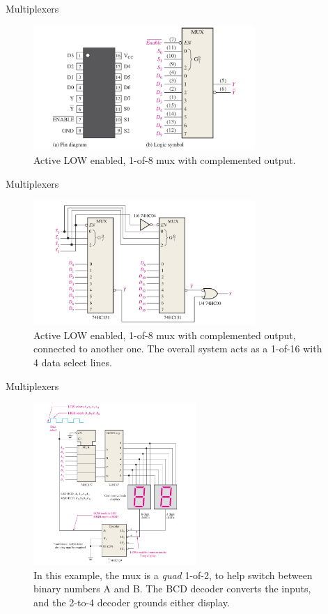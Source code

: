 \documentclass{beamer}
\begin{document}
\begin{frame}{Multiplexers}
\begin{figure}
\centering
\includegraphics[width=0.75\textwidth,trim=3cm 0cm 3cm 0cm,clip=true]{figures/mux5.pdf}
\caption{\label{fig:mux5} Active LOW enabled, 1-of-8 mux with complemented output.}
\end{figure}
\end{frame}

\begin{frame}{Multiplexers}
\begin{figure}
\centering
\includegraphics[width=0.75\textwidth,trim=2cm 0cm 3cm 0cm,clip=true]{figures/mux6.pdf}
\caption{\label{fig:mux6} Active LOW enabled, 1-of-8 mux with complemented output, connected to another one.  The overall system acts as a 1-of-16 with 4 data select lines.}
\end{figure}
\end{frame}

\begin{frame}{Multiplexers}
\begin{figure}
\centering
\includegraphics[width=0.55\textwidth]{figures/mux7.pdf}
\caption{\label{fig:mux7} In this example, the mux is a \textit{quad} 1-of-2, to help switch between binary numbers A and B.  The BCD decoder converts the inputs, and the 2-to-4 decoder grounds either display.}
\end{figure}
\end{frame}
\end{document}
